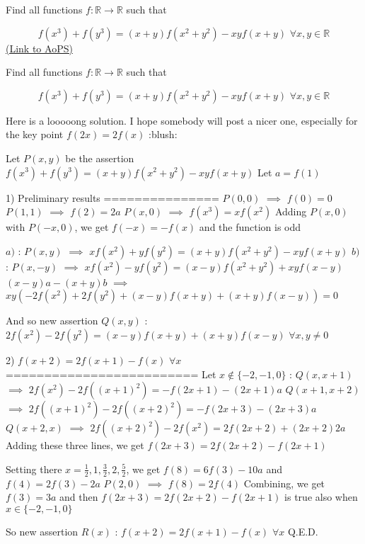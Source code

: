 \begin{problem}
	Find all functions $f: \mathbb R\to\mathbb R$ such that

\[f(x^3)+f(y^3) = (x+y)f(x^2+y^2) - xyf(x+y) \, \, \forall x,y\in\mathbb R\]
	\flushright \href{https://artofproblemsolving.com/community/c6h567180}{(Link to AoPS)}
\end{problem}



\begin{solution}
	\begin{tcolorbox}Find all functions $f: \mathbb R\to\mathbb R$ such that

\[f(x^3)+f(y^3) = (x+y)f(x^2+y^2) - xyf(x+y) \, \, \forall x,y\in\mathbb R\]\end{tcolorbox}
Here is a looooong solution. I hope somebody will post a nicer one, especially for the key point $f(2x)=2f(x)$ :blush:

Let $P(x,y)$ be the assertion $f(x^3)+f(y^3)=(x+y)f(x^2+y^2)-xyf(x+y)$
Let $a=f(1)$

1) Preliminary results 
===============
$P(0,0)$ $\implies$ $f(0)=0$
$P(1,1)$ $\implies$ $f(2)=2a$
$P(x,0)$ $\implies$ $f(x^3)=xf(x^2)$
Adding $P(x,0)$ with $P(-x,0)$, we get $f(-x)=-f(x)$ and the function is odd

$a)$ : $P(x,y)$ $\implies$ $xf(x^2)+yf(y^2)=(x+y)f(x^2+y^2)-xyf(x+y)$
$b)$ : $P(x,-y)$ $\implies$ $xf(x^2)-yf(y^2)=(x-y)f(x^2+y^2)+xyf(x-y)$
$(x-y)a - (x+y)b$ $\implies$  $xy(-2f(x^2)+2f(y^2)+(x-y)f(x+y)+(x+y)f(x-y))=0$

And so new assertion $Q(x,y)$ : $2f(x^2)-2f(y^2)=(x-y)f(x+y)+(x+y)f(x-y)$ $\forall x,y\ne 0$

2) $f(x+2)=2f(x+1)-f(x)$ $\forall x$
=========================
Let $x\notin\{-2,-1,0\}$ :
$Q(x,x+1)$ $\implies$ $2f(x^2)-2f((x+1)^2)=-f(2x+1)-(2x+1)a$ 
$Q(x+1,x+2)$ $\implies$ $2f((x+1)^2)-2f((x+2)^2)=-f(2x+3)-(2x+3)a$ 
$Q(x+2,x)$ $\implies$ $2f((x+2)^2)-2f(x^2)=2f(2x+2)+(2x+2)2a$
Adding these three lines, we get $f(2x+3)=2f(2x+2)-f(2x+1)$

Setting there $x=\frac 12,1,\frac 32,2,\frac 52$, we get $f(8)=6f(3)-10a$ and $f(4)=2f(3)-2a$
$P(2,0)$ $\implies$ $f(8)=2f(4)$
Combining, we get $f(3)=3a$ and then $f(2x+3)=2f(2x+2)-f(2x+1)$ is true also when $x\in\{-2,-1,0\}$

So new assertion $R(x)$ : $f(x+2)=2f(x+1)-f(x)$ $\forall x$
Q.E.D.


\end{solution}
